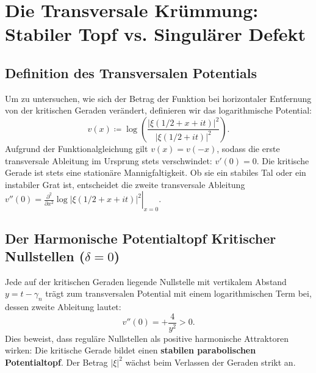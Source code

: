 \documentclass[11pt,a4paper]{article}
\theoremstyle{definition}
\theoremstyle{remark}
\begin{document}
\section{Die Transversale Krümmung: Stabiler Topf vs. Singulärer Defekt}

\subsection{Definition des Transversalen Potentials}
Um zu untersuchen, wie sich der Betrag der Funktion bei horizontaler Entfernung von der kritischen Geraden verändert, definieren wir das logarithmische Potential:
\begin{equation}
v(x) \coloneqq \log \left(\frac{|\xi(1/2 + x + it)|^2}{|\xi(1/2 + it)|^2}\right).
\end{equation}
Aufgrund der Funktionalgleichung gilt $v(x) = v(-x)$, sodass die erste transversale Ableitung im Ursprung stets verschwindet: $v'(0) = 0$. Die kritische Gerade ist stets eine stationäre Mannigfaltigkeit. Ob sie ein stabiles Tal oder ein instabiler Grat ist, entscheidet die zweite transversale Ableitung $v''(0) = \left.\frac{\partial^2}{\partial x^2}\log |\xi(1/2 + x + it)|^2\right|_{x=0}$.

\subsection{Der Harmonische Potentialtopf Kritischer Nullstellen (\texorpdfstring{$\delta = 0$}{delta = 0})}
Jede auf der kritischen Geraden liegende Nullstelle mit vertikalem Abstand $y = t - \gamma_n$ trägt zum transversalen Potential mit einem logarithmischen Term bei, dessen zweite Ableitung lautet:
\begin{equation}
v''(0) = +\frac{4}{y^2} > 0.
\end{equation}
Dies beweist, dass reguläre Nullstellen als positive harmonische Attraktoren wirken: Die kritische Gerade bildet einen \textbf{stabilen parabolischen Potentialtopf}. Der Betrag $|\xi|^2$ wächst beim Verlassen der Geraden strikt an.
\end{document}
